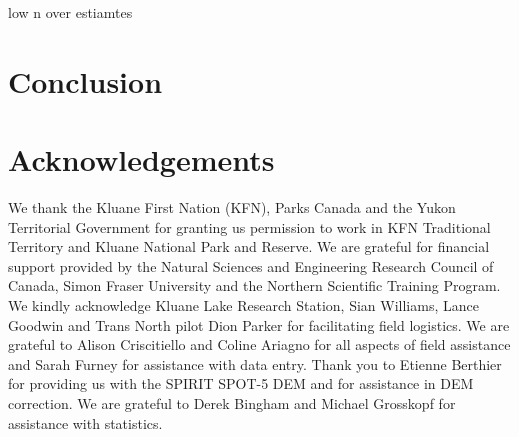 \documentclass[twocolumn,letterpaper]{igs}
\begin{document}
low n over estiamtes


\section{Conclusion}


\section{Acknowledgements}

We thank the Kluane First Nation (KFN), Parks Canada and the Yukon Territorial Government for granting us permission to work in KFN Traditional Territory and Kluane National Park and Reserve. We are grateful for financial support provided by the Natural Sciences and Engineering Research Council of  Canada, Simon Fraser University and the Northern Scientific Training Program. We kindly acknowledge Kluane Lake Research Station, Sian Williams, Lance Goodwin and Trans North pilot Dion Parker for facilitating field logistics. We are grateful to Alison Criscitiello and Coline Ariagno for all aspects of field assistance and Sarah Furney for assistance with data entry. Thank you to Etienne Berthier for providing us with the SPIRIT SPOT-5 DEM and for assistance in DEM correction. We are grateful to Derek Bingham and Michael Grosskopf for assistance with statistics. 



%
%

%


\end{document}
